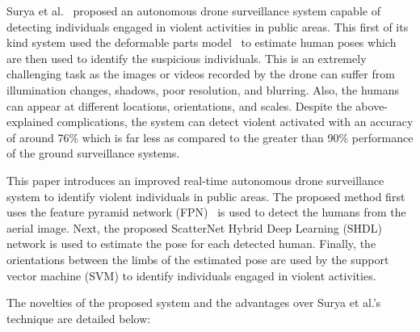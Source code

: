 \documentclass[10pt,twocolumn,letterpaper]{article}
\begin{document}
Surya et al.~\cite{penmetsa2014autonomous} proposed an autonomous drone surveillance system capable of detecting individuals engaged in violent activities in public areas. This first of its kind system used the deformable parts model~\cite{felzenszwalb2005pictorial} to estimate human poses which are then used to identify the suspicious individuals. This is an extremely challenging task as the images or videos recorded by the drone can suffer from illumination changes, shadows, poor resolution, and blurring. Also, the humans can appear at different locations, orientations, and scales. Despite the above-explained complications, the system can detect violent activated with an accuracy of around 76\% which is far less as compared to the greater than 90\% performance of the ground surveillance systems.

This paper introduces an improved real-time autonomous drone surveillance system to identify violent individuals in public areas. The proposed method first uses the feature pyramid network (FPN)~\cite{hd} is used to detect the humans from the aerial image. Next, the proposed ScatterNet Hybrid Deep Learning (SHDL) network is used to estimate the pose for each detected human. Finally, the orientations between the limbs of the estimated pose are used by the support vector machine (SVM) to identify individuals engaged in violent activities. 

The novelties of the proposed system and the advantages over Surya et al.'s~\cite{penmetsa2014autonomous} technique are detailed below: 
\end{document}
